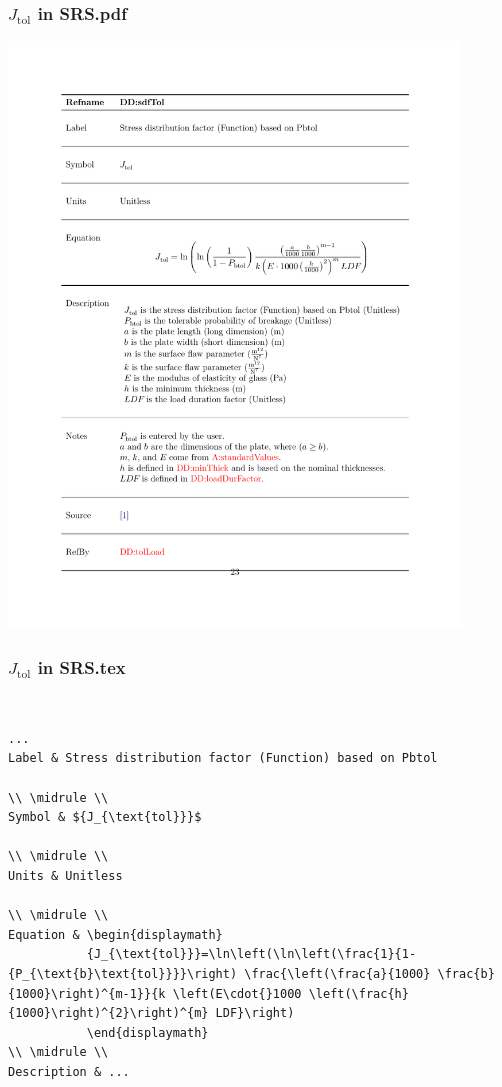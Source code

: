 \documentclass{beamer}
\begin{document}
\begin{frame}

\frametitle{$J_{\mbox{tol}}$ in SRS.pdf}
\begin{center}
\includegraphics[width=0.9\textwidth]{../figures/Jtol_pdf.pdf}
\end{center}
\end{frame}


\begin{frame}

\frametitle{$J_{\mbox{tol}}$ in SRS.tex}
~\\
\begin{lstlisting}
...
Label & Stress distribution factor (Function) based on Pbtol
        
\\ \midrule \\
Symbol & ${J_{\text{tol}}}$
         
\\ \midrule \\
Units & Unitless
        
\\ \midrule \\
Equation & \begin{displaymath}
           {J_{\text{tol}}}=\ln\left(\ln\left(\frac{1}{1-{P_{\text{b}\text{tol}}}}\right) \frac{\left(\frac{a}{1000} \frac{b}{1000}\right)^{m-1}}{k \left(E\cdot{}1000 \left(\frac{h}{1000}\right)^{2}\right)^{m} LDF}\right)
           \end{displaymath}
\\ \midrule \\
Description & ...
\end{lstlisting}
\end{frame}
\end{document}
